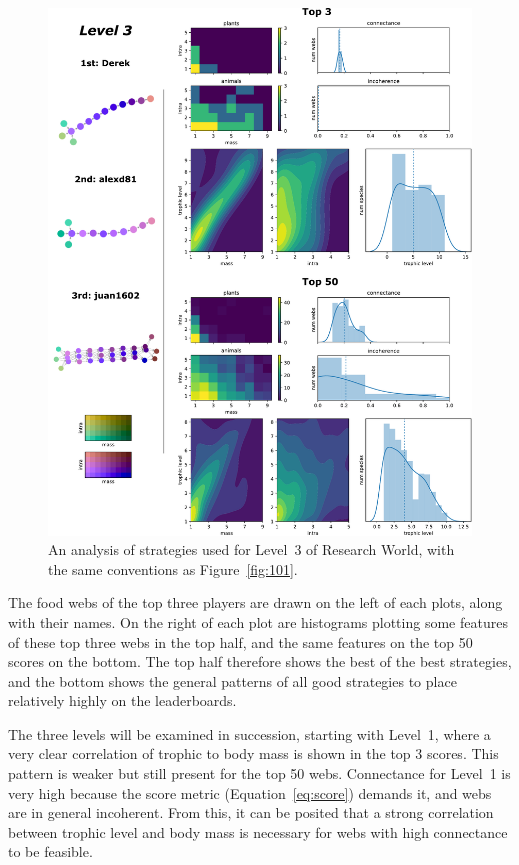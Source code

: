 \begin{figure}
  \centering
  \includegraphics[height=.85\textheight, right]{joy/103.pdf}
  \caption[Results from Research World Level~3]{An analysis of strategies used for Level~3 of Research World, with the same conventions as Figure~\ref{fig:101}.}
  \label{fig:103}
\end{figure}
The food webs of the top three players are drawn on the left of each plots, along with their names. On the right of each plot are histograms plotting some features of these top three webs in the top half, and the same features on the top 50 scores on the bottom. The top half therefore shows the best of the best strategies, and the bottom shows the general patterns of all good strategies to place relatively highly on the leaderboards.

The three levels will be examined in succession, starting with Level~1, where a very clear correlation of trophic to body mass is shown in the top 3 scores. This pattern is weaker but still present for the top 50 webs.
Connectance for Level~1 is very high because the score metric (Equation~\eqref{eq:score}) demands it, and webs are in general incoherent. From this, it can be posited that a strong correlation between trophic level and body mass is necessary for webs with high connectance to be feasible.

